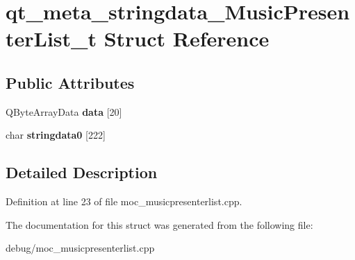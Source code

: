 \hypertarget{structqt__meta__stringdata___music_presenter_list__t}{}\section{qt\+\_\+meta\+\_\+stringdata\+\_\+\+Music\+Presenter\+List\+\_\+t Struct Reference}
\label{structqt__meta__stringdata___music_presenter_list__t}
\subsection*{Public Attributes}
\begin{DoxyCompactItemize}
\item 
\mbox{\label{structqt__meta__stringdata___music_presenter_list__t_ae345be0e7a0222c3f3f796b873b0b430}} 
Q\+Byte\+Array\+Data {\bfseries data} \mbox{[}20\mbox{]}
\item 
\mbox{\label{structqt__meta__stringdata___music_presenter_list__t_acbbe6e51b5fd994e3727f9ae172057ec}} 
char {\bfseries stringdata0} \mbox{[}222\mbox{]}
\end{DoxyCompactItemize}


\subsection{Detailed Description}


Definition at line 23 of file moc\+\_\+musicpresenterlist.\+cpp.



The documentation for this struct was generated from the following file\+:\begin{DoxyCompactItemize}
\item 
debug/moc\+\_\+musicpresenterlist.\+cpp\end{DoxyCompactItemize}
